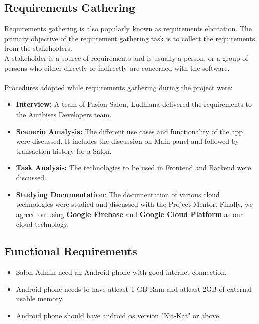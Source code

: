 \subsection{Requirements Gathering}
Requirements gathering is also popularly known as requirements elicitation. The primary objective of the requirement gathering task is to collect the requirements from the stakeholders.\\
A stakeholder is a source of requirements and is usually a person, or a group of persons who either directly or indirectly are concerned with the software.\\
\\
Procedures adopted while requirements gathering during the project were:
\begin{itemize}
	\item \textbf{Interview:} A team of Fusion Salon, Ludhiana delivered the requirements to the Auribises Developers team.
	\item \textbf{Scenerio Amalysis:} The different use cases and functionality of the app were discussed. It includes the discussion on Main panel and followed by transaction history for a Salon.
	\item \textbf{Task Analysis:} The technologies to be used in Frontend and Backend were discussed.
	\item \textbf{Studying Documentation}: The documentation of various cloud technologies were studied and discussed with the Project Mentor. Finally, we agreed on using \textbf{Google Firebase} and \textbf{Google Cloud Platform} as our cloud technology.
\end{itemize}
\subsection{Functional Requirements}
\begin{itemize}
	\item Salon Admin need an Android phone with good internet connection.
	\item Android phone needs to have atleast 1 GB Ram and atleast 2GB of external usable memory.
	\item Android phone should have android os version "Kit-Kat" or above.
\end{itemize}
